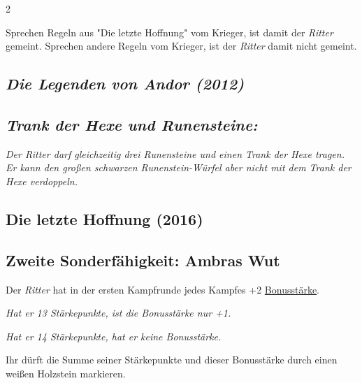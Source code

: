 \documentclass[10pt, a4paper, oneside]{book}
\newcommand{\fan}[1]{\textit{#1}}
\begin{document}
\begin{multicols*}{2}
\begin{nobgcolor}
Sprechen Regeln aus "Die letzte Hoffnung" vom Krieger, ist damit der \fan{Ritter} gemeint. Sprechen andere Regeln vom Krieger, ist der \fan{Ritter} damit nicht gemeint.







\end{nobgcolor}



\begin{bgcolor}
\section{\fan{Die Legenden von Andor (2012)}}

\subsection{\fan{Trank der Hexe und Runensteine:}}

\fan{Der Ritter darf gleichzeitig drei Runensteine und einen Trank der Hexe tragen. Er kann den großen schwarzen Runenstein-Würfel aber nicht mit dem Trank der Hexe verdoppeln.}

\end{bgcolor}



\begin{bgcolor}
\section{Die letzte Hoffnung (2016)}


\subsection{Zweite Sonderfähigkeit: Ambras Wut}

Der \fan{Ritter} hat in der ersten Kampfrunde jedes Kampfes +2 \hyperref[bonusstaerke]{Bonusstärke}.

\fan{Hat er 13 Stärkepunkte, ist die Bonusstärke nur +1.}

\fan{Hat er 14 Stärkepunkte, hat er keine Bonusstärke.}
\supercite{39829}

Ihr dürft die Summe seiner Stärkepunkte und dieser Bonusstärke durch einen weißen Holzstein markieren.\supercite{dlh-begleitheft,dlh11-heldenkarte-krieger}

\end{bgcolor}


\end{multicols*}
\end{document}
